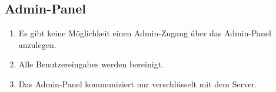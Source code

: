 \subsection*{Admin-Panel}

\begin{samepage}
    \begin{enumerate}[label=\textbf{/NFS\arabic*0/}, align=left, start=4]
        \item Es gibt keine Möglichkeit einen \Gls{Admin-Zugang} über das \Gls{Admin-Panel} anzulegen.
        \item Alle \Glspl{Benutzereingabe} werden bereinigt.
        \item Das \Gls{Admin-Panel} kommuniziert nur verschlüsselt mit dem \Gls{Server}.
    \end{enumerate}
\end{samepage}